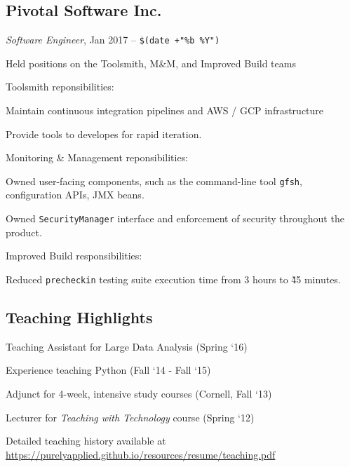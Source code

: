 \documentclass[10pt,letterpaper]{article}
\renewenvironment{itemize}{
  \begin{list}{}{
    \setlength{\leftmargin}{1.5em}
    \setlength{\itemsep}{0.25em}
    \setlength{\parskip}{0pt}
    \setlength{\parsep}{0.25em}
  }
}{
  \end{list}
}
\begin{document}
\subsection*{Pivotal Software Inc.}
\textit{Software Engineer}, Jan 2017 -- \verb!$(date +"%b %Y")!
\begin{itemize}
  \item Held positions on the Toolsmith, M\&M, and Improved Build teams
  \begin{itemize}
    \item Toolsmith reponsibilities:
    \begin{itemize}
      \item Maintain continuous integration pipelines and AWS / GCP infrastructure
      \item Provide tools to developes for rapid iteration.
    \end{itemize}
    \item Monitoring \& Management reponsibilities:
    \begin{itemize}
      \item Owned user-facing components, such as the command-line tool \verb!gfsh!, configuration APIs, JMX beans.
      \item Owned \verb!SecurityManager! interface and enforcement of security throughout the product.
    \end{itemize}
    \item Improved Build responsibilities:
    \begin{itemize}
      \item Reduced \verb!precheckin! testing suite execution time from 3 hours to \~45 minutes.
    \end{itemize}
  \end{itemize}
\end{itemize}

\subsection*{Teaching Highlights}
\begin{itemize}
  \item Teaching Assistant for Large Data Analysis (Spring `16)
  \item Experience teaching Python (Fall `14 - Fall `15)
  \item Adjunct for 4-week, intensive study courses (Cornell, Fall `13)
  \item Lecturer for {\em Teaching with Technology} course (Spring `12)
  \item Detailed teaching history available at
    \url{https://purelyapplied.github.io/resources/resume/teaching.pdf}
\end{itemize}
\end{document}
